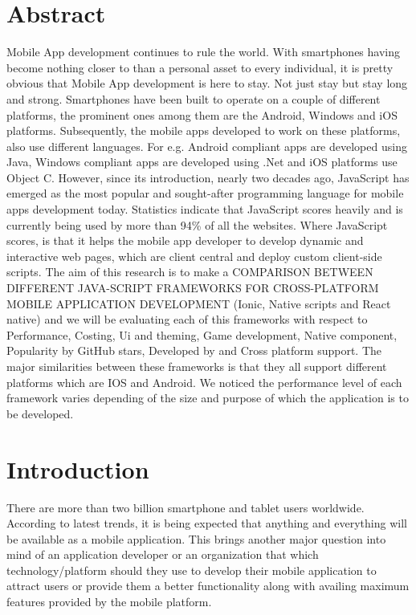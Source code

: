 \documentclass[12pt]{extreport}
\begin{document}
\newpage
\section*{Abstract}
Mobile App development continues to rule the world. With smartphones having become nothing closer to than a personal asset to every individual, it is pretty obvious that Mobile App development is here to stay. Not just stay but stay long and strong. Smartphones have been built to operate on a couple of different platforms, the prominent ones among them are the Android, Windows and iOS platforms. Subsequently, the mobile apps developed to work on these platforms, also use different languages. For e.g. Android compliant apps are developed using Java, Windows compliant apps are developed using .Net and iOS platforms use Object C.
However, since its introduction, nearly two decades ago, JavaScript has emerged as the most popular and sought-after programming language for mobile apps development today. Statistics indicate that JavaScript scores heavily and is currently being used by more than 94\% of all the websites. Where JavaScript scores, is that it helps the mobile app developer to develop dynamic and interactive web pages, which are client central and deploy custom client-side scripts.
The aim of this research is to make a COMPARISON BETWEEN DIFFERENT JAVA-SCRIPT FRAMEWORKS FOR CROSS-PLATFORM MOBILE APPLICATION DEVELOPMENT (Ionic, Native scripts and React native) and we will be evaluating each of this frameworks with respect to Performance, Costing, Ui and theming, Game development, Native component, Popularity by GitHub stars, Developed by and Cross platform support.
The major similarities between these frameworks is that they all support different platforms which are IOS and Android. We noticed the performance level of each framework varies depending of the size and purpose of which the application is to be developed.\begin{flushleft}
	
\end{flushleft}

\newpage
\section*{Introduction}
There are more than two billion smartphone and tablet users worldwide. According to latest trends, it is being expected that anything and everything will be available as a mobile application. This brings another major question into mind of an application developer or an organization that which technology/platform should they use to develop their mobile application to attract users or provide them a better functionality along with availing maximum features provided by the mobile platform.
\end{document}
